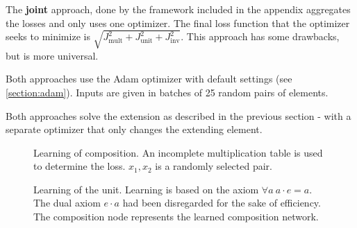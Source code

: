 The \textbf{joint} approach, done by the framework included in the appendix aggregates the losses and only uses one optimizer. The final loss function that the optimizer seeks to minimize is $\sqrt{J_{\text{mult}}^2+J_{\text{unit}}^2+J_{\text{inv}}^2}$. This approach has some drawbacks, but is more universal.

Both approaches use the Adam optimizer with default settings (see \autoref{section:adam}). Inputs are given in batches of 25 random pairs of elements.

Both approaches solve the extension as described in the previous section - with a separate optimizer that only changes the extending element.

\begin{figure}
	\caption{Learning of composition. An incomplete multiplication table is used to determine the loss. $x_1,x_2$ is a randomly selected pair.}
	\label{learning_comp}
	\center
{}
\end{figure}

\begin{figure}
\caption{Learning of the unit. Learning is based on the axiom $\forall a\ a\cdot e=a$. The dual axiom $e\cdot a$ had been disregarded for the sake of efficiency. The composition node represents the learned composition network.}
\center
\label{learning_unit}
\end{figure}

